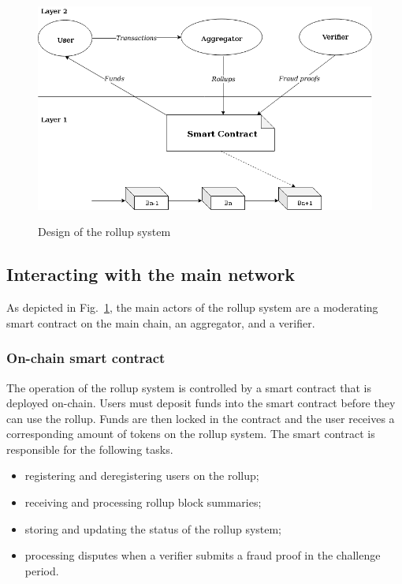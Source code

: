 \documentclass{article}
\begin{document}
\begin{figure}[t]
\caption{Design of the rollup system}
\includegraphics[width=12cm]{rollup-design.png}
\centering
\label{rollup-design}
\end{figure}

\subsection{Interacting with the main network}
As depicted in Fig.~\ref{rollup-design}, the main actors of the rollup system are a moderating smart contract on the main chain, an aggregator, and a verifier.

\subsubsection{On-chain smart contract}
The operation of the rollup system is controlled by a smart contract that is deployed on-chain. Users must deposit funds into the smart contract before they can use the rollup. Funds are then locked in the contract and the user receives a corresponding amount of tokens on the rollup system. The smart contract is responsible  for the following tasks.
\begin{itemize} 
\item registering and deregistering users on the rollup;
\item receiving and processing rollup block summaries; 
\item storing and updating the status of the rollup system;  
\item processing disputes when a verifier submits a fraud proof in the challenge period.
\end{itemize}
\end{document}
